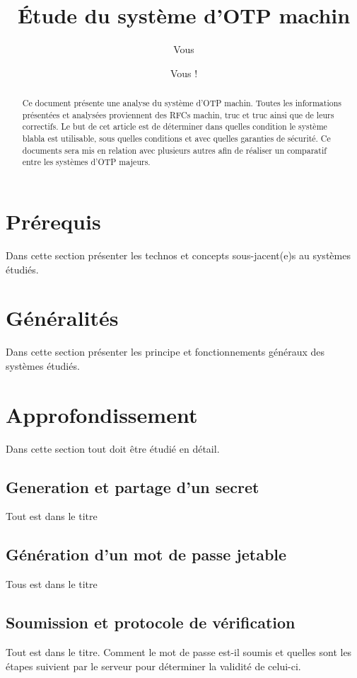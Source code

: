 \documentclass[10pt]{article}
\author{Vous}
\title{Étude du système d'OTP machin}
\author{Vous !}
\begin{document}
\maketitle

\begin{abstract}
Ce document présente une analyse du système d'OTP machin. Toutes les informations présentées et analysées proviennent des RFCs machin, truc et truc ainsi que de leurs 
correctifs. Le but de cet article est de déterminer dans quelles condition le système blabla est utilisable, sous quelles conditions et avec quelles garanties de sécurité.
Ce documents sera mis en relation avec plusieurs autres afin de réaliser un comparatif entre les systèmes d'OTP majeurs.
\end{abstract}
\newpage
\tableofcontents
\newpage

\section{Prérequis}
Dans cette section présenter les technos et concepts sous-jacent(e)s au systèmes étudiés.

\section{Généralités}
Dans cette section présenter les principe et fonctionnements généraux des systèmes étudiés.

\section{Approfondissement}
  Dans cette section tout doit \^etre étudié en détail.
  \subsection{Generation et partage d'un secret}
  Tout est dans le titre
  
  \subsection{Génération d'un mot de passe jetable}
  Tous est dans le titre
  
  \subsection{Soumission et protocole de vérification}
  Tout est dans le titre. Comment le mot de passe est-il soumis et quelles sont les étapes suivient par le serveur pour déterminer la validité de celui-ci.
  
\end{document}
